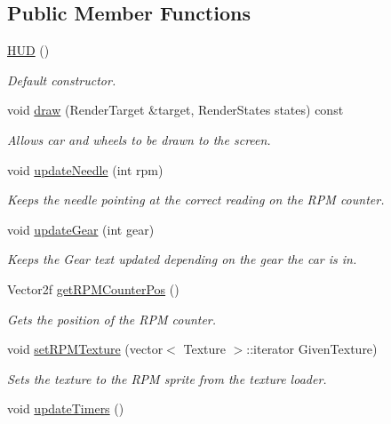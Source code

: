 \subsection*{Public Member Functions}
\begin{DoxyCompactItemize}
\item 
\hyperlink{class_h_u_d_a568b8ee1591f9ba3ed36ae05966f6b56}{H\+U\+D} ()
\begin{DoxyCompactList}\small\item\em Default constructor. \end{DoxyCompactList}\item 
void \hyperlink{class_h_u_d_a16086edcd0d5d6e62bd4d911dd0145e5}{draw} (Render\+Target \&target, Render\+States states) const 
\begin{DoxyCompactList}\small\item\em Allows car and wheels to be drawn to the screen. \end{DoxyCompactList}\item 
void \hyperlink{class_h_u_d_a96d4d120cedd21c3153d3c1fc45f5ef6}{update\+Needle} (int rpm)
\begin{DoxyCompactList}\small\item\em Keeps the needle pointing at the correct reading on the R\+P\+M counter. \end{DoxyCompactList}\item 
void \hyperlink{class_h_u_d_a0dc3e03d60ae3626345d9dc7e8287ff5}{update\+Gear} (int gear)
\begin{DoxyCompactList}\small\item\em Keeps the Gear text updated depending on the gear the car is in. \end{DoxyCompactList}\item 
Vector2f \hyperlink{class_h_u_d_adaa1781bccee569c107a667b095752de}{get\+R\+P\+M\+Counter\+Pos} ()
\begin{DoxyCompactList}\small\item\em Gets the position of the R\+P\+M counter. \end{DoxyCompactList}\item 
void \hyperlink{class_h_u_d_a2dbbea5e46016273c6d916718d0e3d5d}{set\+R\+P\+M\+Texture} (vector$<$ Texture $>$\+::iterator Given\+Texture)
\begin{DoxyCompactList}\small\item\em Sets the texture to the R\+P\+M sprite from the texture loader. \end{DoxyCompactList}\item 
void \hyperlink{class_h_u_d_a18bacebe294e788fd5ed81df01231915}{update\+Timers} ()

\end{DoxyCompactItemize}
